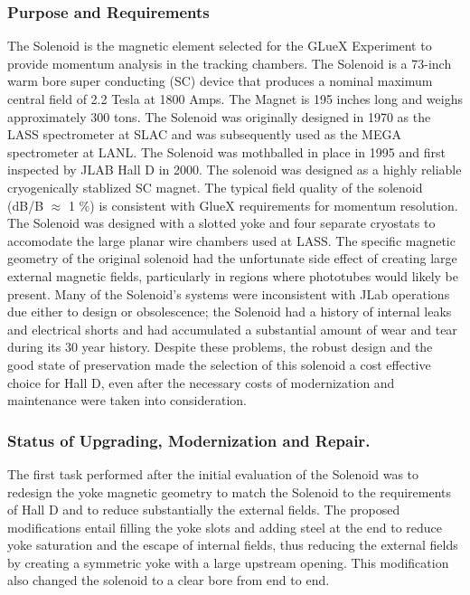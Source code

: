 \subsubsection*{Purpose and Requirements}

The Solenoid is the magnetic element selected for the GLueX Experiment to
provide momentum analysis in the tracking chambers. The Solenoid
is a 73-inch warm bore super conducting (SC) device that produces
a nominal maximum central field of 2.2 Tesla at 1800 Amps. The Magnet is
195 inches long and weighs  approximately 300 tons. The Solenoid was originally
 designed in 1970 as the LASS spectrometer at
SLAC and was subsequently used as the MEGA spectrometer at LANL. The
Solenoid was mothballed in place
in 1995 and first inspected by JLAB Hall D in 2000. The solenoid was
designed as a highly reliable cryogenically stablized SC magnet.
The typical field quality of the solenoid (dB/B $\approx$ 1 \%) is consistent with GlueX
requirements for momentum resolution. The Solenoid was
designed with a slotted yoke and four separate cryostats to accomodate 
the large planar wire chambers used at LASS.
The specific magnetic geometry of the original solenoid had the unfortunate 
side effect of
creating large external magnetic fields, particularly in regions where
phototubes would likely be present. Many of the Solenoid's systems were
inconsistent with JLab operations due either to design or obsolescence; 
the Solenoid had a history
of internal leaks and electrical shorts and had accumulated a substantial 
amount of wear and tear during its 30 year history.
Despite these problems, the robust design and the good state of
preservation made the selection of this solenoid a cost effective
choice for Hall D, even after the necessary costs of modernization and
maintenance were taken into consideration.

\subsubsection*{Status of Upgrading, Modernization and Repair.}

 The first task
performed after the initial evaluation of the Solenoid was to redesign the
yoke magnetic geometry to match the Solenoid to the requirements of Hall D
and to reduce substantially the external fields. The proposed modifications
entail filling the yoke slots and adding steel at the end to reduce yoke
saturation and the escape of internal fields, thus reducing the external
fields by creating a symmetric yoke with a large upstream opening. This
modification also changed the solenoid to a clear bore from end to end.

